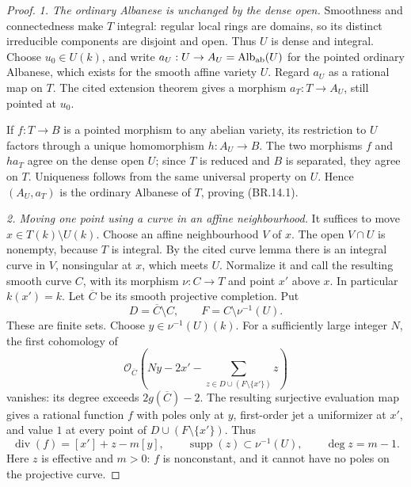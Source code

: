 \begin{proof}
\emph{1. The ordinary Albanese is unchanged by the dense open.}
Smoothness and connectedness make \(T\) integral: regular local
rings are domains, so its distinct irreducible components are
disjoint and open.  Thus \(U\) is dense and integral.  Choose
\(u_0\in U(k)\), and write
\(a_U:U\to A_U=\operatorname{Alb}_{\rm ab}(U)\) for the pointed
ordinary Albanese, which exists for the smooth affine variety
\(U\).  Regard \(a_U\) as a rational map on \(T\).  The cited
extension theorem gives a morphism \(a_T:T\to A_U\), still
pointed at \(u_0\).

If \(f:T\to B\) is a pointed morphism to any abelian variety,
its restriction to \(U\) factors through a unique homomorphism
\(h:A_U\to B\).  The two morphisms \(f\) and \(h a_T\)
agree on the dense open \(U\); since \(T\) is reduced and
\(B\) is separated, they agree on \(T\).  Uniqueness follows
from the same universal property on \(U\).  Hence \((A_U,a_T)\)
is the ordinary Albanese of \(T\), proving (BR.14.1).

\emph{2. Moving one point using a curve in an affine neighbourhood.}
It suffices to move \(x\in T(k)\setminus U(k)\).  Choose an
affine neighbourhood \(V\) of \(x\).  The open \(V\cap U\)
is nonempty, because \(T\) is integral.  By the cited curve lemma
there is an integral curve in \(V\), nonsingular at \(x\),
which meets \(U\).  Normalize it and call the resulting smooth
curve \(C\), with its morphism \(\nu:C\to T\) and point
\(x'\) above \(x\).  In particular \(k(x')=k\).  Let
\(\overline C\) be its smooth projective completion.  Put
\[
 D=\overline C\setminus C,\qquad
 F=C\setminus\nu^{-1}(U).
\]
These are finite sets.  Choose \(y\in\nu^{-1}(U)(k)\).
For a sufficiently large integer \(N\), the first cohomology of
\[
 \mathcal O_{\overline C}
 \left(Ny-2x'-\sum_{z\in D\cup(F\setminus\{x'\})}z\right)
\]
vanishes: its degree exceeds \(2g(\overline C)-2\).
The resulting surjective evaluation map gives a rational
function \(f\) with poles only at \(y\), first-order jet a
uniformizer at \(x'\), and value \(1\) at every point of
\(D\cup(F\setminus\{x'\})\).  Thus
\[
       \operatorname{div}(f)=[x']+z-m[y],\qquad
       \operatorname{supp}(z)\subset\nu^{-1}(U),
       \qquad \deg z=m-1.                                  \tag{BR.14.5}
\]
Here \(z\) is effective and \(m>0\): \(f\) is nonconstant,
and it cannot have no poles on the projective curve.


\end{proof}
